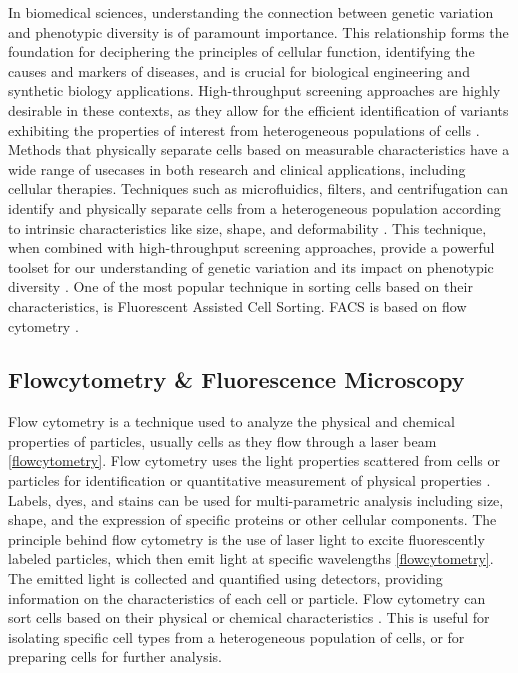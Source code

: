 \documentclass[12pt,a4paper]{article}
\begin{document}
In biomedical sciences, understanding the connection between genetic variation and phenotypic diversity is of paramount importance. This relationship forms the foundation for deciphering the principles of cellular function, identifying the causes and markers of diseases, and is crucial for biological engineering and synthetic biology applications. High-throughput screening approaches are highly desirable in these contexts, as they allow for the efficient identification of variants exhibiting the properties of interest from heterogeneous populations of cells \cite{Pegoraro2017-rs}. Methods that physically separate cells based on measurable characteristics have a wide range of usecases in both research and clinical applications, including cellular therapies. Techniques such as microfluidics, filters, and centrifugation can identify and physically separate cells from a heterogeneous population according to intrinsic characteristics like size, shape, and deformability \cite{https://doi.org/10.1002/bit.22833}. This technique, when combined with high-throughput screening approaches, provide a powerful toolset for our understanding of genetic variation and its impact on phenotypic diversity \cite{vandereyken_sifrim_thienpont_voet_2023}. One of the most popular technique in sorting cells based on their characteristics, is Fluorescent Assisted Cell Sorting. FACS is based on flow cytometry \cite{liao_makris_luo_2016}.

\subsection{Flowcytometry \& Fluorescence Microscopy}

Flow cytometry is a technique used to analyze the physical and chemical properties of particles, usually cells as they flow through a laser beam \ref{flowcytometry}. Flow cytometry uses the light properties scattered from cells or particles for identification or quantitative measurement of physical properties \cite{mckinnon_2018}. Labels, dyes, and stains can be used for multi-parametric analysis including size, shape, and the expression of specific proteins or other cellular components. The principle behind flow cytometry is the use of laser light to excite fluorescently labeled particles, which then emit light at specific wavelengths \ref{flowcytometry}. The emitted light is collected and quantified using detectors, providing information on the characteristics of each cell or particle. Flow cytometry can sort cells based on their physical or chemical characteristics \cite{mckinnon_2018}. This is useful for isolating specific cell types from a heterogeneous population of cells, or for preparing cells for further analysis.
\end{document}

